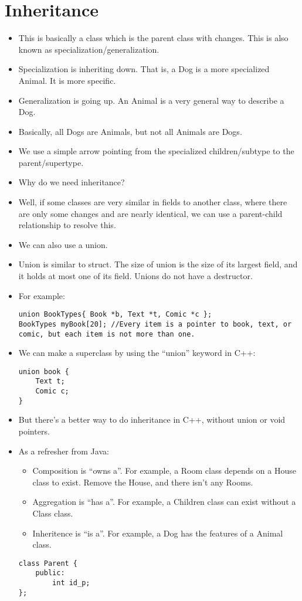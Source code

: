 \documentclass{article}
\begin{document}
\section{Inheritance}
\begin{itemize}
\item This is basically a class which is the parent class with changes.  This is also known as specialization/generalization.
\item Specialization is inheriting down.  That is, a Dog is a more specialized Animal.  It is more specific.
\item Generalization is going up.  An Animal is a very general way to describe a Dog. 
\item Basically, all Dogs are Animals, but not all Animals are Dogs.
\item We use a simple arrow pointing from the specialized children/subtype to the parent/supertype.
\item Why do we need inheritance?
\item Well, if some classes are very similar in fields to another class, where there are only some changes and are nearly identical, we can use a parent-child relationship to resolve this.
\item We can also use a union. 
\item Union is similar to struct.  The size of union is the size of its largest field, and it holds at most one of its field.  Unions do not have a destructor.
\item For example:
\begin{lstlisting}
union BookTypes{ Book *b, Text *t, Comic *c };
BookTypes myBook[20]; //Every item is a pointer to book, text, or comic, but each item is not more than one.
\end{lstlisting}
\item We can make a superclass by using the ``union'' keyword in C++:
\begin{lstlisting}
union book {
    Text t;
    Comic c;
}
\end{lstlisting}
\item But there's a better way to do inheritance in C++, without union or void pointers.
\item As a refresher from Java:
\begin{itemize}
\item Composition is ``owns a''.  For example, a Room class depends on a House class to exist.  Remove the House, and there isn't any Rooms.
\item Aggregation is ``has a''.   For example, a Children class can exist without a Class class.
\item Inheritence is ``is a''.  For example, a Dog has the features of a Animal class.
\end{itemize}
\begin{lstlisting}
class Parent {
    public:
        int id_p;
};


\end{lstlisting}
\end{itemize}
\end{document}
